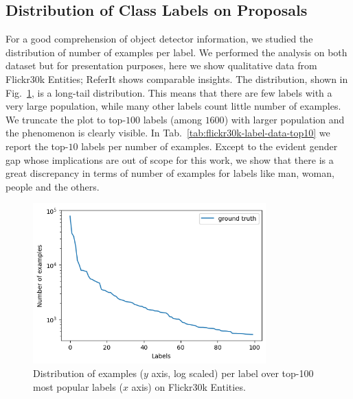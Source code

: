 \subsection{Distribution of Class Labels on Proposals}

For a good comprehension of object detector information, we studied
the distribution of number of examples per label. We performed the
analysis on both dataset but for presentation purposes, here we show
qualitative data from Flickr30k Entities; ReferIt shows comparable
insights. The distribution, shown in
Fig.~\ref{fig:flickr30k-label-distribution-top10}, is a long-tail
distribution. This means that there are few labels with a very large
population, while many other labels count little number of examples.
We truncate the plot to top-$100$ labels (among $1600$) with larger
population and the phenomenon is clearly visible. In
Tab.~\ref{tab:flickr30k-label-data-top10} we report the top-$10$
labels per number of examples. Except to the evident gender gap whose
implications are out of scope for this work, we show that there is a
great discrepancy in terms of number of examples for labels like man,
woman, people and the others.

\begin{figure}
  \centering
  \includegraphics[width=0.8\textwidth]{figures/number-of-examples-per-label-over-top-100-most-popular-labels.png}
  \caption[Number of examples per label over top-100 most popular
    labels on Flickr30k Entities]{ Distribution of examples ($y$ axis, log
    scaled) per label over top-100 most popular labels ($x$ axis) on
    Flickr30k Entities.}
  \label{fig:flickr30k-label-distribution-top10}
\end{figure}

